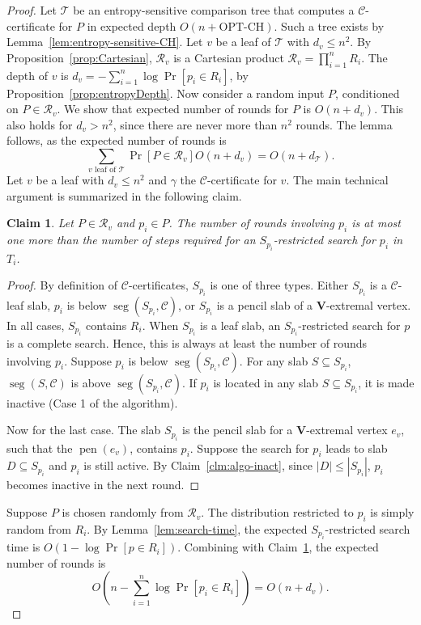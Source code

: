 \documentclass[letterpaper,11pt]{article}
\newtheorem{claim}[theorem]{Claim}
\newcommand{\OPTCH}{\text{OPT-CH}}
\DeclareMathOperator{\seg}{seg}
\DeclareMathOperator{\pen}{pen}
\newcommand{\cC}{\mathcal{C}}
\newcommand{\cR}{\mathcal{R}}
\newcommand{\cT}{\mathcal{T}}
\begin{document}
\begin{proof} 
Let $\cT$ be an entropy-sensitive 
comparison tree that 
computes a $\cC$-certificate for 
$P$ in expected depth $O(n + \OPTCH)$. 
Such a tree exists by 
Lemma~\ref{lem:entropy-sensitive-CH}.
Let $v$ be a leaf of $\cT$ with 
$d_v \leq n^2$. By 
Proposition~\ref{prop:Cartesian},
$\cR_v$ is a Cartesian product 
$\cR_v = \prod_{i=1}^n R_i$.
The depth of $v$ is 
$d_v = -\sum_{i=1}^n \log \Pr[p_i \in R_i]$, 
by Proposition~\ref{prop:entropyDepth}. 
Now consider a random input $P$, 
conditioned on $P \in \cR_v$. We 
show that expected number of rounds 
for $P$ is  $O(n + d_v)$. This
also holds for $d_v > n^2$, since
there are never more than $n^2$ rounds.
The lemma follows, as the 
expected number of rounds is
\[ 
  \sum_{v \text{ leaf of } \cT} \Pr[P \in \mathcal{R}_v] O(n + d_v) =
  O(n + d_\cT).
\]
Let $v$ be a leaf with $d_v \leq n^2$ and $\gamma$ the 
$\cC$-certificate for 
$v$. The main technical argument is 
summarized in the following claim.

\begin{claim}\label{clm:algoCH} 
  Let $P \in \cR_v$ and
  $p_i \in P$. The number 
  of rounds involving 
  $p_i$ is at most one more than 
  the number of steps required for an
  $S_{p_i}$-restricted search for 
  $p_i$ in $T_i$.
\end{claim}

\begin{proof} 
By definition of $\cC$-certificates, 
$S_{p_i}$ is one of three types. 
Either $S_{p_i}$ is a $\cC$-leaf slab, 
$p_i$ is below $\seg(S_{p_i},\cC)$,
or $S_{p_i}$ is a pencil slab of a 
$\textbf{V}$-extremal vertex. 
In all cases, $S_{p_i}$ contains $R_i$.
When $S_{p_i}$ is a leaf slab, an
$S_{p_i}$-restricted search for $p$ is 
a complete search. Hence, this is 
always at least the number of rounds 
involving $p_i$.
Suppose $p_i$ is below $\seg(S_{p_i},\cC)$. 
For any slab $S \subseteq S_{p_i}$,
$\seg(S,\cC)$ is above $\seg(S_{p_i},\cC)$. 
If $p_i$ is located in any slab $S \subseteq S_{p_i}$,
it is made inactive (Case 1 of the algorithm). 

Now for the last case. 
The slab $S_{p_i}$ is the pencil slab 
for a $\textbf{V}$-extremal vertex $e_v$,
such that the $\pen(e_v)$, contains $p_i$. 
Suppose the search for $p_i$ leads to 
slab $D \subseteq S_{p_i}$ and $p_i$
is still active.
By Claim~\ref{clm:algo-inact}, since 
$|D| \leq |S_{p_i}|$, $p_i$ becomes
inactive in the next round.
\end{proof}

Suppose $P$ is chosen randomly from 
$\cR_v$. The distribution restricted 
to $p_i$ is simply random from $R_i$.  
By Lemma~\ref{lem:search-time}, the 
expected $S_{p_i}$-restricted search 
time is $O(1-\log \Pr[p \in R_i])$. Combining 
with Claim~\ref{clm:algoCH}, the expected
number of rounds is 
\[
  O(n -\sum_{i=1}^n \log \Pr[p_i  \in R_i]) = O(n + d_v).
\]
\end{proof}
\end{document}
